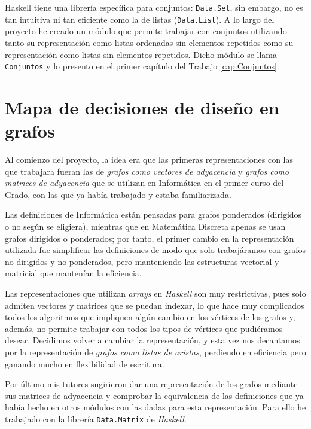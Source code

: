Haskell tiene una librería específica para conjuntos: \texttt{Data.Set}, sin
embargo, no es tan intuitiva ni tan eficiente como la de listas 
(\texttt{Data.List}). A lo largo del proyecto he creado un módulo que permite
trabajar con conjuntos utilizando tanto su representación como listas ordenadas
sin elementos repetidos como su representación como listas sin elementos
repetidos. Dicho módulo se llama \texttt{Conjuntos} y lo presento en el primer
capítulo del Trabajo \ref{cap:Conjuntos}.

\section{Mapa de decisiones de diseño en grafos}

Al comienzo del proyecto, la idea era que las primeras representaciones con las
que trabajara fueran las de \textit{grafos como vectores de adyacencia} y 
\textit{grafos como matrices de adyacencia} que se utilizan en Informática en el
primer curso del Grado, con las que ya había trabajado y estaba familiarizada. 

Las definiciones de Informática están pensadas para grafos ponderados (dirigidos
o no según se eligiera), mientras que en Matemática Discreta apenas se usan 
grafos dirigidos o ponderados; por tanto, el primer cambio en la representación 
utilizada fue simplificar las definiciones de modo que solo trabajáramos con
grafos no dirigidos y no ponderados, pero manteniendo las estructuras vectorial
y matricial que mantenían la eficiencia. 

Las representaciones que utilizan \textit{arrays} en \textit{Haskell} son muy
restrictivas, pues solo admiten vectores y matrices que se puedan indexar, lo
que hace muy complicados todos los algoritmos que impliquen algún cambio en los
vértices de los grafos y, además, no permite trabajar con todos los tipos de
vértices que pudiéramos desear. Decidimos volver a cambiar la representación, y
esta vez nos decantamos por la representación de \textit{grafos como listas de
aristas}, perdiendo en eficiencia pero ganando mucho en flexibilidad de
escritura.

Por último mis tutores sugirieron dar una representación de los grafos
mediante sus matrices de adyacencia y comprobar la equivalencia de las
definiciones que ya había hecho en otros módulos con las dadas para esta 
representación. Para ello he trabajado con la librería \texttt{Data.Matrix} 
de \textit{Haskell}.

